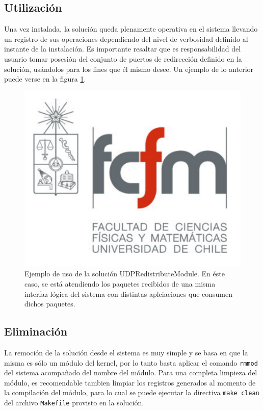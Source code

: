 \subsection{Utilización}
Una vez instalada, la solución queda plenamente operativa en el sistema llevando un registro de sus operaciones dependiendo del nivel de verbosidad definido al instante de la instalación. Es importante resaltar que es responsabilidad del usuario tomar posesión del conjunto de puertos de redirección definido en la solución, usándolos para los fines que él mismo desee. Un ejemplo de lo anterior puede verse en la figura \ref{fig:usageUDPModule}.

\begin{figure}[!h]
	\centering
	\includegraphics[scale=.3]{imagenes/fcfm}
	\caption{Ejemplo de uso de la solución UDPRedistributeModule. En éste caso, se está atendiendo los paquetes recibidos de una misma interfaz lógica del sistema con distintas aplciaciones que consumen dichos paquetes.}
	\label{fig:usageUDPModule}
\end{figure}

\subsection{Eliminación}
La remoción de la solución desde el sistema es muy simple y se basa en que la misma es sólo un módulo del kernel, por lo tanto basta aplicar el comando \verb=rmmod= del sistema acompañado del nombre del módulo. Para una completa limpieza del módulo, es recomendable tambien limpiar los registros generados al momento de la compilación del módulo, para lo cual se puede ejecutar la directiva \verb=make clean= del archivo \verb=Makefile= provisto en la solución.

